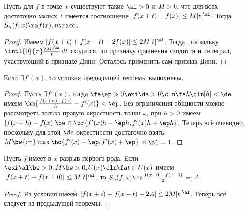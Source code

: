 \documentclass[a4paper]{article}
\newcommand{\intlop}{\intl{0}{\pi}}
\begin{document}
\begin{theorem}
Пусть для $f$ в точке $x$ существуют такие $\al > 0$ и $M>0$, что для всех достаточно малых~$t$ имеется
соотношение $|f(x+t)-f(x)|\le M|t|^\al$. Тогда $S_n(f,x) \ra f(x), n\ra \infty$.
\end{theorem}
\begin{proof}
Имеем $|f(x+t) + f(x-t) - 2f(x)| \le 2M|t|^\al$. Тогда, поскольку $\intlop\frac{2Mt^\al}{t}\,d t$
сходится, по признаку сравнения сходится и интеграл, участвующий в признаке Дини. Осталось
применить сам признак Дини.
\end{proof}

\begin{imp}\label{diff:dini}
Если $\exi f'(x)$, то условия предыдущей теоремы выполнены.
\end{imp}
\begin{proof}
Пусть $\exi f'(x)$, тогда $\fa \ep > 0 \exi \de > 0\cln \fa h\cln |h|<\de$ имеем $\hm{\frac{f(x+h)-f(x)}{h} - f'(x)}<\ep$.
Без ограничения общности можно рассмотреть только правую окрестность точки $x$,  при $h > 0$ имеем
$|f(x+h) - f(x)| \bw\in \br{f'(x)h-\ep h, f'(x)h + \ep h}$. Теперь всё очевидно, поскольку для этой $\de$-окрестности
достаточно взять $M \bw{:=} \max\hc{f'(x)-\ep, f'(x) + \ep}$ и $\al = 1$.
\end{proof}

\begin{imp}
Пусть $f$ имеет в $x$ разрыв первого рода. Если $\exi\al\bw>0, M \bw>0, U(x)\cln \fa t \in U(x)$ имеем $|f(x+t)-f(x\pm 0)|\le M|t|^\al$,
то $S_n(f,x) \ra \frac{f(x+0)+f(x-0)}{2} =: A$.
\end{imp}
\begin{proof}
Из условия имеем $|f(x+t)-f(x-t) - 2A| \le 2M|t|^\al$. Теперь всё следует из предыдущей теоремы.
\end{proof}
\end{document}
